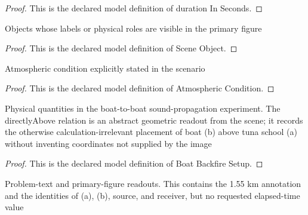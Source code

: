 \begin{proof}
  This is the declared model definition of duration In Seconds.
\end{proof}
\begin{definition}
  \label{def:physics:phyx-mini-0215:phyxminiproblems-problemphyxmini0215-sceneobject}
  Objects whose labels or physical roles are visible in the primary figure
\end{definition}
\begin{proof}
  This is the declared model definition of Scene Object.
\end{proof}
\begin{definition}
  \label{def:physics:phyx-mini-0215:phyxminiproblems-problemphyxmini0215-atmosphericcondition}
  Atmospheric condition explicitly stated in the scenario
\end{definition}
\begin{proof}
  This is the declared model definition of Atmospheric Condition.
\end{proof}
\begin{definition}
  \label{def:physics:phyx-mini-0215:phyxminiproblems-problemphyxmini0215-boatbackfiresetup}
  Physical quantities in the boat-to-boat sound-propagation experiment. The directlyAbove relation is an abstract geometric readout from the scene; it records the otherwise calculation-irrelevant placement of boat (b) above tuna school (a) without inventing coordinates not supplied by the image
\end{definition}
\begin{proof}
  This is the declared model definition of Boat Backfire Setup.
\end{proof}
\begin{definition}
  \label{def:physics:phyx-mini-0215:phyxminiproblems-problemphyxmini0215-matchesproblemandfigure}
  Problem-text and primary-figure readouts. This contains the 1.55 km annotation and the identities of (a), (b), source, and receiver, but no requested elapsed-time value
\end{definition}

